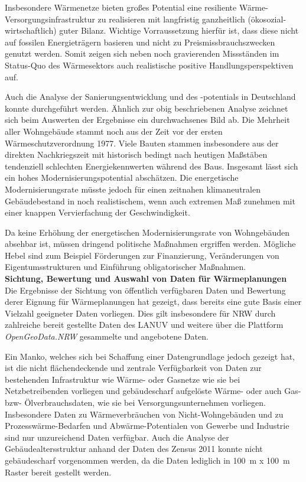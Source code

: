 		Insbesondere Wärmenetze bieten großes Potential eine resiliente Wärme-Versorgungsinfrastruktur zu realisieren mit langfristig ganzheitlich (ökosozial-wirtschaftlich) guter Bilanz. Wichtige Vorraussetzung hierfür ist, dass diese nicht auf fossilen Energieträgern basieren und nicht zu Preismissbrauchszwecken genutzt werden. Somit zeigen sich neben noch gravierenden Missständen im Status-Quo des Wärmesektors auch realistische positive Handlungsperspektiven auf. 
		
		Auch die Analyse der Sanierungsentwicklung und des -potentials in Deutschland konnte durchgeführt werden. Ähnlich zur obig beschriebenen Analyse zeichnet sich beim Auswerten der Ergebnisse ein durchwachsenes Bild ab. Die Mehrheit aller Wohngebäude stammt noch aus der Zeit vor der ersten Wärmeschutzverordnung 1977. Viele Bauten stammen insbesondere aus der direkten Nachkriegszeit mit historisch bedingt nach heutigen Maßstäben tendenziell schlechten Energiekennwerten während des Baus. Insgesamt lässt sich ein hohes Modernisierungspotential abschätzen. Die energetische Modernisierungsrate müsste jedoch für einen zeitnahen klimaneutralen Gebäudebestand in noch realistischem, wenn auch extremen Maß zunehmen mit einer knappen Vervierfachung der Geschwindigkeit. 
		
		Da keine Erhöhung der energetischen Modernisierungsrate von Wohngebäuden absehbar ist, müssen dringend politische Maßnahmen ergriffen werden. Mögliche Hebel sind zum Beispiel Förderungen zur Finanzierung, Veränderungen von Eigentumsstrukturen und Einführung obligatorischer Maßnahmen. \\
		
		\textbf{Sichtung, Bewertung und Auswahl von Daten für Wärmeplanungen}\\
		Die Ergebnisse der Sichtung von öffentlich verfügbaren Daten und Bewertung derer Eignung für Wärmeplanungen hat gezeigt, dass bereits eine gute Basis einer Vielzahl geeigneter Daten vorliegen. Dies gilt insbesondere für NRW durch zahlreiche bereit gestellte Daten des LANUV und weitere über die Plattform \textit{OpenGeoData.NRW} gesammelte und angebotene Daten. 
		
		Ein Manko, welches sich bei Schaffung einer Datengrundlage jedoch gezeigt hat, ist die nicht flächendeckende und zentrale Verfügbarkeit von Daten zur bestehenden Infrastruktur wie Wärme- oder Gasnetze wie sie bei Netzbetreibenden vorliegen und gebäudescharf aufgelöste Wärme- oder auch Gas- bzw- Ölverbrauchsdaten, wie sie bei Versorgungsunternehmen vorliegen. Insbesondere Daten zu Wärmeverbräuchen von Nicht-Wohngebäuden und zu Prozesswärme-Bedarfen und Abwärme-Potentialen von Gewerbe und Industrie sind nur unzureichend Daten verfügbar. Auch die Analyse der Gebäudealtersstruktur anhand der Daten des Zensus 2011 konnte nicht gebäudescharf vorgenommen werden, da die Daten lediglich in 100~m x 100~m Raster bereit gestellt werden. 
			
